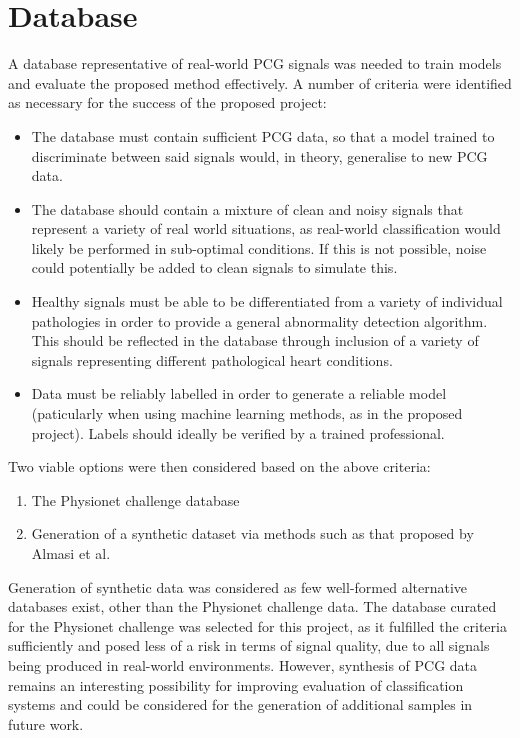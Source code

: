 \documentclass[titlepage, 12pt]{scrartcl} \usepackage{enumitem}
\begin{document}
\section{Database}\label{Database}
A database representative of real-world PCG signals was needed to train models
and evaluate the proposed method effectively.  A number of criteria were
identified as necessary for the success of the proposed project:
\begin{itemize}
    \item The database must contain sufficient PCG data, so that a model
        trained to discriminate between said signals would, in theory, generalise
        to new PCG data.
    \item The database should contain a mixture of clean and noisy signals that
        represent a variety of real world situations, as real-world
        classification would likely be performed in sub-optimal conditions. If
        this is not possible, noise could potentially be added to clean signals
        to simulate this.
    \item Healthy signals must be able to be differentiated from a variety of
        individual pathologies in order to provide a general abnormality
        detection algorithm. This should be reflected in the database through
        inclusion of a variety of signals representing different pathological
        heart conditions.
    \item Data must be reliably labelled in order to generate a reliable model
        (paticularly when using machine learning methods, as in the proposed
        project). Labels should ideally be verified by a trained professional.
\end{itemize}
\noindent
Two viable options were then considered based on the above criteria:
\begin{enumerate}
    \item The Physionet challenge database
    \item Generation of a synthetic dataset via methods such as that proposed
    by Almasi et al.~\parencite{Almasi2011}
\end{enumerate}

Generation of synthetic data was considered as few well-formed alternative
databases exist, other than the Physionet challenge data. The database curated
for the Physionet challenge was selected for this project, as it fulfilled the
criteria sufficiently and posed less of a risk in terms of signal quality, due
to all signals being produced in real-world environments. However, synthesis
of PCG data remains an interesting possibility for improving evaluation of
classification systems and could be considered for the generation of additional
samples in future work.
\end{document}
